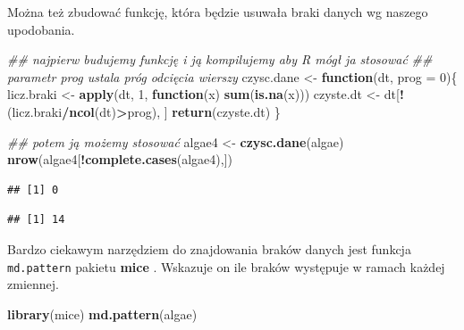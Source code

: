 \documentclass[]{book}
\newenvironment{Shaded}{\begin{snugshade}}{\end{snugshade}}
\newcommand{\CommentTok}[1]{\textcolor[rgb]{0.56,0.35,0.01}{\textit{#1}}}
\newcommand{\ControlFlowTok}[1]{\textcolor[rgb]{0.13,0.29,0.53}{\textbf{#1}}}
\newcommand{\DataTypeTok}[1]{\textcolor[rgb]{0.13,0.29,0.53}{#1}}
\newcommand{\DecValTok}[1]{\textcolor[rgb]{0.00,0.00,0.81}{#1}}
\newcommand{\FloatTok}[1]{\textcolor[rgb]{0.00,0.00,0.81}{#1}}
\newcommand{\KeywordTok}[1]{\textcolor[rgb]{0.13,0.29,0.53}{\textbf{#1}}}
\newcommand{\NormalTok}[1]{#1}
\newcommand{\OperatorTok}[1]{\textcolor[rgb]{0.81,0.36,0.00}{\textbf{#1}}}
\newcommand{\StringTok}[1]{\textcolor[rgb]{0.31,0.60,0.02}{#1}}
\theoremstyle{plain}
\theoremstyle{definition}
\begin{document}
Można też zbudować funkcję, która będzie usuwała braki danych wg naszego upodobania.

\begin{Shaded}
\begin{Highlighting}[]
\CommentTok{## najpierw budujemy funkcję i ją kompilujemy aby R mógł ja stosować}
\CommentTok{## parametr prog ustala próg odcięcia wierszy}
\NormalTok{czysc.dane <-}\StringTok{ }\ControlFlowTok{function}\NormalTok{(dt, }\DataTypeTok{prog =} \DecValTok{0}\NormalTok{)\{}
\NormalTok{    licz.braki <-}\StringTok{ }\KeywordTok{apply}\NormalTok{(dt, }\DecValTok{1}\NormalTok{, }\ControlFlowTok{function}\NormalTok{(x) }\KeywordTok{sum}\NormalTok{(}\KeywordTok{is.na}\NormalTok{(x)))}
\NormalTok{    czyste.dt <-}\StringTok{ }\NormalTok{dt[}\OperatorTok{!}\NormalTok{(licz.braki}\OperatorTok{/}\KeywordTok{ncol}\NormalTok{(dt)}\OperatorTok{>}\NormalTok{prog), ]}
    \KeywordTok{return}\NormalTok{(czyste.dt)}
\NormalTok{\}}
    
\CommentTok{## potem ją możemy stosować}
\NormalTok{algae4 <-}\StringTok{ }\KeywordTok{czysc.dane}\NormalTok{(algae)}
\KeywordTok{nrow}\NormalTok{(algae4[}\OperatorTok{!}\KeywordTok{complete.cases}\NormalTok{(algae4),])}
\end{Highlighting}
\end{Shaded}

\begin{verbatim}
## [1] 0
\end{verbatim}

\begin{Shaded}
\end{Shaded}

\begin{verbatim}
## [1] 14
\end{verbatim}

Bardzo ciekawym narzędziem do znajdowania braków danych jest funkcja \texttt{md.pattern} pakietu \textbf{mice} \citep{R-mice}. Wskazuje on ile braków występuje w ramach każdej zmiennej.

\begin{Shaded}
\begin{Highlighting}[]
\KeywordTok{library}\NormalTok{(mice)}
\KeywordTok{md.pattern}\NormalTok{(algae)}
\end{Highlighting}
\end{Shaded}
\end{document}
